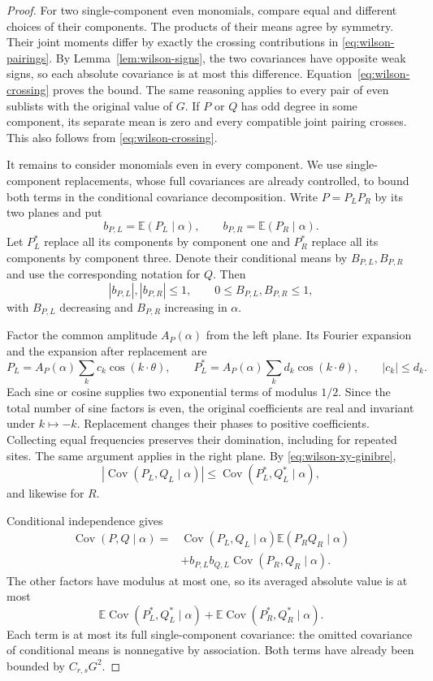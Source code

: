 \begin{proof}
For two single-component even monomials, compare equal and
different choices of their components. The products of their
means agree by symmetry. Their joint moments differ by exactly
the crossing contributions in \eqref{eq:wilson-pairings}.
By Lemma~\ref{lem:wilson-signs}, the two covariances have opposite
weak signs, so each absolute covariance is at most this difference.
Equation~\eqref{eq:wilson-crossing} proves the bound. The same
reasoning applies to every pair of even sublists with the
original value of $G$. If $P$ or $Q$ has odd degree in some
component, its separate mean is zero and every compatible
joint pairing crosses. This also follows from
\eqref{eq:wilson-crossing}.

It remains to consider monomials even in every component.
We use single-component replacements, whose full covariances are already
controlled, to bound both terms in the conditional covariance decomposition.
Write $P=P_LP_R$ by its two planes and put
\[
 b_{P,L}=\mathbb E(P_L\mid\alpha),\qquad
 b_{P,R}=\mathbb E(P_R\mid\alpha).
\]
Let $P_L^*$ replace all its components by component one and
$P_R^*$ replace all its components by component three. Denote
their conditional means by $B_{P,L},B_{P,R}$ and use the
corresponding notation for $Q$. Then
\[
 |b_{P,L}|,|b_{P,R}|\le1,\qquad
 0\le B_{P,L},B_{P,R}\le1,
\]
with $B_{P,L}$ decreasing and $B_{P,R}$ increasing in $\alpha$.

Factor the common amplitude $A_P(\alpha)$ from the left plane.
Its Fourier expansion and the expansion after replacement are
\[
 P_L=A_P(\alpha)\sum_k c_k\cos(k\cdot\theta),\qquad
 P_L^*=A_P(\alpha)\sum_k d_k\cos(k\cdot\theta),\qquad
 |c_k|\le d_k.
\]
Each sine or cosine supplies two exponential terms of modulus
$1/2$. Since the total number of sine factors is even, the
original coefficients are real and invariant under $k\mapsto-k$.
Replacement changes their phases to positive coefficients.
Collecting equal frequencies preserves their domination,
including for repeated sites. The same argument applies in
the right plane. By \eqref{eq:wilson-xy-ginibre},
\begin{equation}
 |\operatorname{Cov}(P_L,Q_L\mid\alpha)|
 \le\operatorname{Cov}(P_L^*,Q_L^*\mid\alpha),
 \label{eq:wilson-fourier-covariance}
\end{equation}
and likewise for $R$.

Conditional independence gives
\begin{align*}
 \operatorname{Cov}(P,Q\mid\alpha)
 ={}&\operatorname{Cov}(P_L,Q_L\mid\alpha)
                    \mathbb E(P_RQ_R\mid\alpha)\\
 &+b_{P,L}b_{Q,L}\operatorname{Cov}(P_R,Q_R\mid\alpha).
\end{align*}
The other factors have modulus at most one, so its averaged
absolute value is at most
\[
 \mathbb E\operatorname{Cov}(P_L^*,Q_L^*\mid\alpha)
 +\mathbb E\operatorname{Cov}(P_R^*,Q_R^*\mid\alpha).
\]
Each term is at most its full single-component covariance:
the omitted covariance of conditional means is nonnegative
by association. Both terms have already been bounded by
$C_{r,s}G^2$.


\end{proof}
